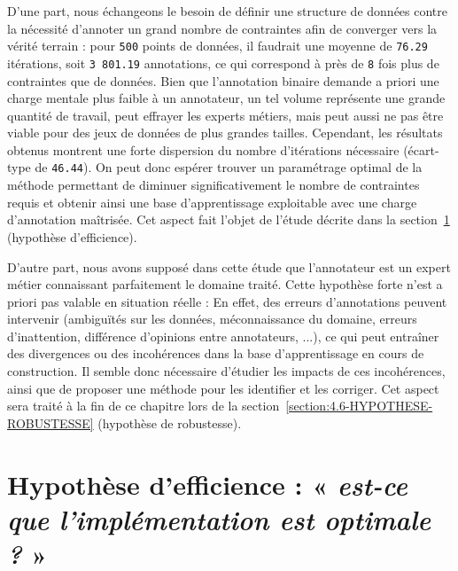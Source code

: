 				D'une part, nous échangeons le besoin de définir une structure de données contre la nécessité d'annoter un grand nombre de contraintes afin de converger vers la vérité terrain : pour \texttt{500} points de données, il faudrait une moyenne de \texttt{76.29} itérations, soit \texttt{3 801.19} annotations, ce qui correspond à près de \texttt{8} fois plus de contraintes que de données.
				Bien que l'annotation binaire demande a priori une charge mentale plus faible à un annotateur, un tel volume représente une grande quantité de travail, peut effrayer les experts métiers, mais peut aussi ne pas être viable pour des jeux de données de plus grandes tailles.
				Cependant, les résultats obtenus montrent une forte dispersion du nombre d'itérations nécessaire (écart-type de \texttt{46.44}).
				On peut donc espérer trouver un paramétrage optimal de la méthode permettant de diminuer significativement le nombre de contraintes requis et obtenir ainsi une base d'apprentissage exploitable avec une charge d'annotation maîtrisée.
				Cet aspect fait l'objet de l'étude décrite dans la section~\ref{section:4.2-HYPOTHESE-EFFICIENCE} (hypothèse d'efficience).
				
				D'autre part, nous avons supposé dans cette étude que l'annotateur est un expert métier connaissant parfaitement le domaine traité.
				Cette hypothèse forte n'est a priori pas valable en situation réelle : En effet, des erreurs d'annotations peuvent intervenir (ambiguïtés sur les données, méconnaissance du domaine, erreurs d'inattention, différence d'opinions entre annotateurs, ...), ce qui peut entraîner des divergences ou des incohérences dans la base d'apprentissage en cours de construction.
				Il semble donc nécessaire d'étudier les impacts de ces incohérences, ainsi que de proposer une méthode pour les identifier et les corriger.
				Cet aspect sera traité à la fin de ce chapitre lors de la section~\ref{section:4.6-HYPOTHESE-ROBUSTESSE} (hypothèse de robustesse).
	

    \section{Hypothèse d'efficience : « \textit{est-ce que l'implémentation est optimale ?} »}
	\label{section:4.2-HYPOTHESE-EFFICIENCE}
	
